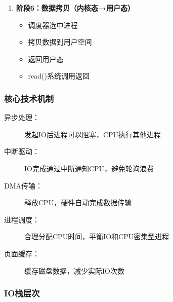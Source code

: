 \documentclass[UTF8,a4paper,12pt]{ctexart}
\begin{document}
\begin{enumerate}[leftmargin=2em]
    \item \textbf{阶段6：数据拷贝（内核态→用户态）}
    \begin{itemize}
        \item 调度器选中进程
        \item 拷贝数据到用户空间
        \item 返回用户态
        \item read()系统调用返回
    \end{itemize}
\end{enumerate}

\subsubsection{核心技术机制}

\begin{description}
    \item[异步处理：] 发起IO后进程可以阻塞，CPU执行其他进程
    \item[中断驱动：] IO完成通过中断通知CPU，避免轮询浪费
    \item[DMA传输：] 释放CPU，硬件自动完成数据传输
    \item[进程调度：] 合理分配CPU时间，平衡IO和CPU密集型进程
    \item[页面缓存：] 缓存磁盘数据，减少实际IO次数
\end{description}

\subsubsection{IO栈层次}
\end{document}
